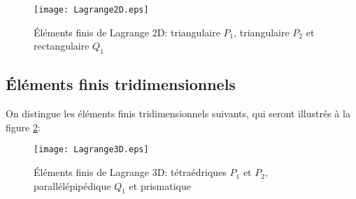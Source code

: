 \begin{figure}[ht]
\centering
\texttt{[image: Lagrange2D.eps]}
\caption{\label{Lagrange2D} Éléments finis de Lagrange 2D: triangulaire $P_1$, triangulaire $P_2$ et rectangulaire $Q_1$}
\end{figure}

\medskip
\subsection*{Éléments finis tridimensionnels}

On distingue les éléments finis tridimensionnels suivants, qui seront illustrés à la figure \ref{Lagrange3D}:
\begin{figure}[ht]
\centering
\texttt{[image: Lagrange3D.eps]}
\caption{Éléments finis de Lagrange 3D: tétraédriques $P_1$ et $P_2$, parallélépipédique $Q_1$ et prismatique}\label{Lagrange3D}
\end{figure}
